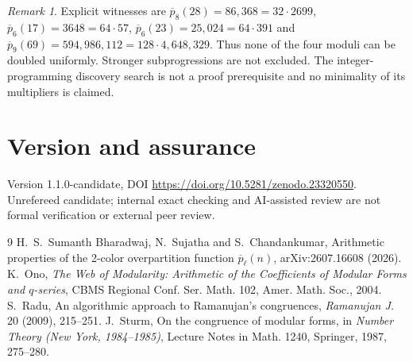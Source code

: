 \documentclass[11pt]{article}
\theoremstyle{remark}\newtheorem{remark}[theorem]{Remark}
\newcommand{\pb}{\overline{p}}
\begin{document}
\begin{remark}
Explicit witnesses are $\pb_8(28)=86{,}368=32\cdot2699$, $\pb_6(17)=3648=64\cdot57$, $\pb_6(23)=25{,}024=64\cdot391$ and $\pb_9(69)=594{,}986{,}112=128\cdot4{,}648{,}329$. Thus none of the four moduli can be doubled uniformly. Stronger subprogressions are not excluded. The integer-programming discovery search is not a proof prerequisite and no minimality of its multipliers is claimed.
\end{remark}

\section*{Version and assurance}
Version 1.1.0-candidate, DOI \url{https://doi.org/10.5281/zenodo.23320550}. Unrefereed candidate; internal exact checking and AI-assisted review are not formal verification or external peer review.
\begin{thebibliography}{9}
 H.~S.~Sumanth Bharadwaj, N.~Sujatha and S.~Chandankumar, Arithmetic properties of the 2-color overpartition function $\overline{p}_\ell(n)$, arXiv:2607.16608 (2026).
 K.~Ono, \emph{The Web of Modularity: Arithmetic of the Coefficients of Modular Forms and $q$-series}, CBMS Regional Conf. Ser. Math. 102, Amer. Math. Soc., 2004.
 S.~Radu, An algorithmic approach to Ramanujan's congruences, \emph{Ramanujan J.} 20 (2009), 215--251.
 J.~Sturm, On the congruence of modular forms, in \emph{Number Theory (New York, 1984--1985)}, Lecture Notes in Math. 1240, Springer, 1987, 275--280.
\end{thebibliography}
\end{document}
